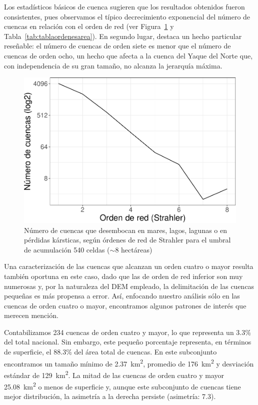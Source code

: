 \documentclass[spanish]{article}
\begin{document}
Los estadísticos básicos de cuenca sugieren que los resultados obtenidos
fueron consistentes, pues observamos el típico decrecimiento exponencial
del número de cuencas en relación con el orden de red (ver
Figura~\ref{fig:ordennumcuencas} y Tabla~\ref{tab:tablaordenesarea}). En
segundo lugar, destaca un hecho particular reseñable: el número de
cuencas de orden siete es menor que el número de cuencas de orden ocho,
un hecho que afecta a la cuenca del Yaque del Norte que, con
independencia de su gran tamaño, no alcanza la jerarquía máxima.

\begin{figure}

{\centering \includegraphics[width=0.6\linewidth]{preprint_files/figure-latex/ordennumcuencas-1} 

}

\caption{Número de cuencas que desembocan en mares, lagos, lagunas o en pérdidas kársticas, según órdenes de red de Strahler para el umbral de acumulación 540 celdas ($\sim$8 hectáreas)}\label{fig:ordennumcuencas}
\end{figure}

Una caracterización de las cuencas que alcanzan un orden cuatro o mayor
resulta también oportuna en este caso, dado que las de orden de red
inferior son muy numerosas y, por la naturaleza del DEM empleado, la
delimitación de las cuencas pequeñas es más propensa a error. Así,
enfocando nuestro análisis sólo en las cuencas de orden cuatro o mayor,
encontramos algunos patrones de interés que merecen mención.

Contabilizamos 234 cuencas de orden cuatro y mayor, lo que representa un
3.3\% del total nacional. Sin embargo, este pequeño porcentaje
representa, en términos de superficie, el 88.3\% del área total de
cuencas. En este subconjunto encontramos un tamaño mínimo de
2.37~km\textsuperscript{2}, promedio de 176~km\textsuperscript{2} y
desviación estándar de 129~km\textsuperscript{2}. La mitad de las
cuencas de orden cuatro y mayor 25.08~km\textsuperscript{2} o menos de
superficie y, aunque este subconjunto de cuencas tiene mejor
distribución, la asimetría a la derecha persiste (asimetría: 7.3).
\end{document}
